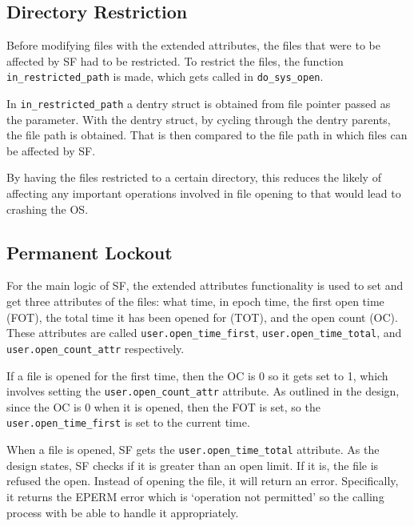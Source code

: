 \subsection{Directory Restriction}
Before modifying files with the extended attributes, the files that were to be affected by SF had to be restricted. To restrict the files, the function \texttt{in\_restricted\_path} is made, which gets called in \texttt{do\_sys\_open}. 

In \texttt{in\_restricted\_path} a dentry struct is obtained from file pointer passed as the parameter. With the dentry struct, by cycling through the dentry parents, the file path is obtained. That is then compared to the file path in which files can be affected by SF.

By having the files restricted to a certain directory, this reduces the likely of affecting any important operations involved in file opening to that would lead to crashing the OS. 

\subsection{Permanent Lockout}
For the main logic of SF, the extended attributes functionality is used to set and get three attributes of the files: what time, in epoch time, the first open time (FOT), the total time it has been opened for (TOT), and the open count (OC). These attributes are called \texttt{user.open\_time\_first}, \texttt{user.open\_time\_total}, and \texttt{user.open\_count\_attr} respectively.

If a file is opened for the first time, then the OC is 0 so it gets set to 1, which involves setting the \texttt{user.open\_count\_attr} attribute. As outlined in the design, since the OC is 0 when it is opened, then the FOT is set, so the \texttt{user.open\_time\_first} is set to the current time.

When a file is opened, SF gets the \texttt{user.open\_time\_total} attribute. As the design states, SF checks if it is greater than an open limit. If it is, the file is refused the open. Instead of opening the file, it will return an error. Specifically, it returns the EPERM error which is `operation not permitted' so the calling process with be able to handle it appropriately. 

